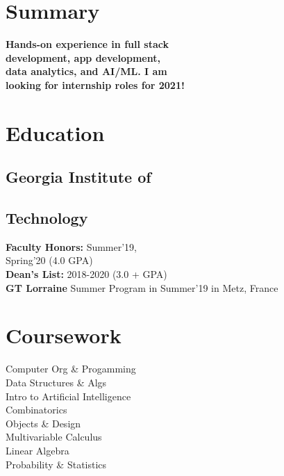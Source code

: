 \documentclass[]{saumya-resume}
\begin{document}
\lastupdated



\begin{minipage}[t]{0.33\textwidth} 

\section{Summary}
{\bf Hands-on experience in full stack}\\
{\bf development, app development,}\\
{\bf data analytics, and AI/ML. I am }\\
{\bf looking for internship roles for 2021!}

\sectionsep


\section{Education} 

\subsection{Georgia Institute of}
\subsection{Technology}
\vskip 0.05in
\vskip 0.05in
{\bf Faculty Honors:} Summer'19,\\
Spring'20 (4.0 GPA)\\
{\bf Dean's List:} 2018-2020 (3.0 + GPA) \\
{\bf GT Lorraine} Summer Program in Summer'19 in Metz, France
\sectionsep


\section{Coursework}
Computer Org \& Progamming \\
Data Structures \& Algs \\
Intro to Artificial Intelligence \\
Combinatorics \\
Objects \& Design \\
Multivariable Calculus \\
Linear Algebra \\
Probability \& Statistics\\
\sectionsep


\end{minipage}
\end{document}
